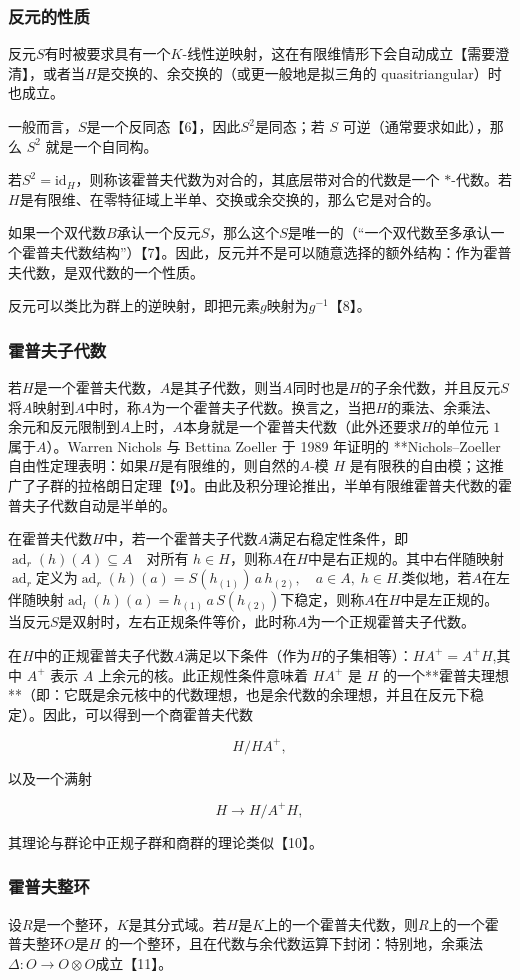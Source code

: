 \subsubsection{反元的性质}
反元$S$有时被要求具有一个$K$-线性逆映射，这在有限维情形下会自动成立【需要澄清】，或者当$H$是交换的、余交换的（或更一般地是拟三角的 quasitriangular）时也成立。

一般而言，$S$是一个反同态【6】，因此$S^2$是同态；若 $S$ 可逆（通常要求如此），那么 $S^2$ 就是一个自同构。

若$S^2 = \mathrm{id}_H$，则称该霍普夫代数为对合的，其底层带对合的代数是一个 $*$-代数。若$H$是有限维、在零特征域上半单、交换或余交换的，那么它是对合的。

如果一个双代数$B$承认一个反元$S$，那么这个$S$是唯一的（“一个双代数至多承认一个霍普夫代数结构”）【7】。因此，反元并不是可以随意选择的额外结构：作为霍普夫代数，是双代数的一个性质。

反元可以类比为群上的逆映射，即把元素$g$映射为$g^{-1}$【8】。
\subsubsection{霍普夫子代数}
若$H$是一个霍普夫代数，$A$是其子代数，则当$A$同时也是$H$的子余代数，并且反元$S$将$A$映射到$A$中时，称$A$为一个霍普夫子代数。换言之，当把$H$的乘法、余乘法、余元和反元限制到$A$上时，$A$本身就是一个霍普夫代数（此外还要求$H$的单位元 $1$属于$A$）。Warren Nichols 与 Bettina Zoeller 于 1989 年证明的 **Nichols–Zoeller 自由性定理表明：如果$H$是有限维的，则自然的$A$-模 $H$ 是有限秩的自由模；这推广了子群的拉格朗日定理【9】。由此及积分理论推出，半单有限维霍普夫代数的霍普夫子代数自动是半单的。

在霍普夫代数$H$中，若一个霍普夫子代数$A$满足右稳定性条件，即$\operatorname{ad}_r(h)(A) \subseteq A \quad \text{对所有 } h \in H$，则称$A$在$H$中是右正规的。其中右伴随映射$\operatorname{ad}_r$定义为$\operatorname{ad}_r(h)(a) = S(h_{(1)})\, a \, h_{(2)}, \quad a \in A, \; h \in H$.类似地，若$A$在左伴随映射$\operatorname{ad}_l(h)(a) = h_{(1)}\, a \, S(h_{(2)})$下稳定，则称$A$在$H$中是左正规的。当反元$S$是双射时，左右正规条件等价，此时称$A$为一个正规霍普夫子代数。

在$H$中的正规霍普夫子代数$A$满足以下条件（作为$H$的子集相等）：$H A^{+} = A^{+} H$,其中 $A^{+}$ 表示 $A$ 上余元的核。此正规性条件意味着 $H A^{+}$ 是 $H$ 的一个**霍普夫理想**（即：它既是余元核中的代数理想，也是余代数的余理想，并且在反元下稳定）。因此，可以得到一个商霍普夫代数

$$
H / H A^{+},
$$

以及一个满射

$$
H \to H / A^{+} H,
$$

其理论与群论中正规子群和商群的理论类似【10】。
\subsubsection{霍普夫整环}
设$R$是一个整环，$K$是其分式域。若$H$是$K$上的一个霍普夫代数，则$R$上的一个霍普夫整环$O$是$H$ 的一个整环，且在代数与余代数运算下封闭：特别地，余乘法$\Delta : O \to O \otimes O$成立【11】。
